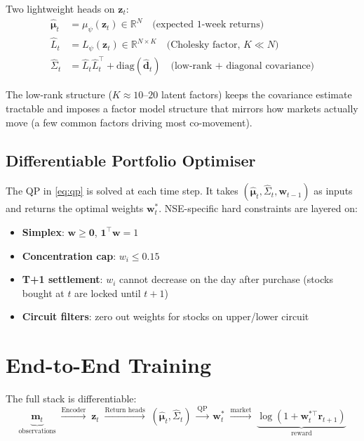 \documentclass[11pt, a4paper]{article}
\begin{document}
Two lightweight heads on $\mathbf{z}_t$:
\begin{align}
  \hat{\boldsymbol{\mu}}_t  &= \mu_\psi(\mathbf{z}_t) \in \mathbb{R}^N
    \quad\text{(expected 1-week returns)} \\
  \hat{L}_t                 &= L_\psi(\mathbf{z}_t) \in \mathbb{R}^{N \times K}
    \quad\text{(Cholesky factor, } K \ll N \text{)} \\
  \hat{\Sigma}_t            &= \hat{L}_t \hat{L}_t^\top + \text{diag}(\hat{\mathbf{d}}_t)
    \quad\text{(low-rank + diagonal covariance)}
\end{align}

The low-rank structure ($K \approx 10$--$20$ latent factors) keeps the
covariance estimate tractable and imposes a factor model structure that mirrors
how markets actually move (a few common factors driving most co-movement).

\subsection{Differentiable Portfolio Optimiser}

The QP in \eqref{eq:qp} is solved at each time step.  It takes
$(\hat{\boldsymbol{\mu}}_t, \hat{\Sigma}_t, \mathbf{w}_{t-1})$ as inputs and
returns the optimal weights $\mathbf{w}_t^*$.  NSE-specific hard constraints are
layered on:

\begin{itemize}[noitemsep]
  \item \textbf{Simplex}: $\mathbf{w} \geq \mathbf{0}$, $\mathbf{1}^\top\mathbf{w} = 1$
  \item \textbf{Concentration cap}: $w_i \leq 0.15$
  \item \textbf{T+1 settlement}: $w_i$ cannot decrease on the day after purchase
        (stocks bought at $t$ are locked until $t+1$)
  \item \textbf{Circuit filters}: zero out weights for stocks on upper/lower circuit
\end{itemize}

\section{End-to-End Training}

The full stack is differentiable:
\[
  \underbrace{\mathbf{m}_t}_{\text{observations}}
  \;\xrightarrow{\text{Encoder}}\;
  \mathbf{z}_t
  \;\xrightarrow{\text{Return heads}}\;
  (\hat{\boldsymbol{\mu}}_t, \hat{\Sigma}_t)
  \;\xrightarrow{\text{QP}}\;
  \mathbf{w}_t^*
  \;\xrightarrow{\text{market}}\;
  \underbrace{\log(1 + \mathbf{w}_t^{*\top}\mathbf{r}_{t+1})}_{\text{reward}}
\]
\end{document}
